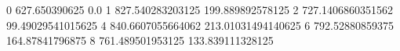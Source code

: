 0 627.650390625 0.0
1 827.540283203125 199.889892578125
2 727.1406860351562 99.49029541015625
4 840.6607055664062 213.01031494140625
6 792.52880859375 164.87841796875
8 761.489501953125 133.839111328125
